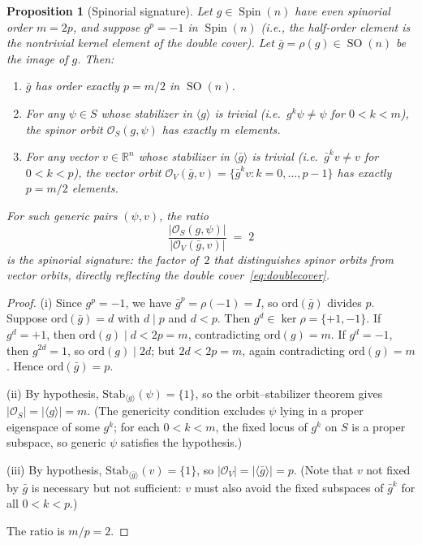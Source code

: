 \documentclass[11pt,reqno]{amsart}
\theoremstyle{plain}
\newtheorem{proposition}[theorem]{Proposition}
\theoremstyle{definition}
\theoremstyle{remark}
\newcommand{\R}{\mathbb{R}}
\newcommand{\Stab}{\mathrm{Stab}}
\DeclareMathOperator{\Spin}{Spin}
\DeclareMathOperator{\SO}{SO}
\begin{document}
\begin{proposition}[Spinorial signature]\label{prop:signature}
Let $g \in \Spin(n)$ have even spinorial order $m = 2p$,
and suppose $g^p = -1$ in $\Spin(n)$
(i.e., the half-order element is the nontrivial kernel element
of the double cover).
Let $\bar{g} = \rho(g) \in \SO(n)$ be the image of $g$.
Then:
\begin{enumerate}[label=(\roman*)]
\item $\bar{g}$ has order exactly $p = m/2$ in $\SO(n)$.
\item For any $\psi \in S$ whose stabilizer in
  $\langle g \rangle$ is trivial
  (i.e.\ $g^k \psi \neq \psi$ for $0 < k < m$),
  the spinor orbit
  $\mathcal{O}_S(g,\psi)$ has exactly $m$ elements.
\item For any vector $v \in \R^n$ whose stabilizer in
  $\langle \bar{g} \rangle$ is trivial
  (i.e.\ $\bar{g}^k v \neq v$ for $0 < k < p$),
  the vector orbit
  $\mathcal{O}_V(\bar{g},v) =
  \{\bar{g}^k v : k = 0,\ldots,p-1\}$
  has exactly $p = m/2$ elements.
\end{enumerate}
For such generic pairs $(\psi, v)$, the ratio
\begin{equation}\label{eq:signature}
  \frac{|\mathcal{O}_S(g,\psi)|}{|\mathcal{O}_V(\bar{g},v)|}
  \;=\; 2
\end{equation}
is the \emph{spinorial signature}: the factor of~$2$ that
distinguishes spinor orbits from vector orbits, directly
reflecting the double cover~\eqref{eq:doublecover}.
\end{proposition}

\begin{proof}
(i) Since $g^p = -1$, we have
$\bar{g}^p = \rho(-1) = I$, so
$\mathrm{ord}(\bar{g})$ divides $p$.
Suppose $\mathrm{ord}(\bar{g}) = d$ with $d \mid p$
and $d < p$.
Then $g^d \in \ker\rho = \{+1,-1\}$.
If $g^d = +1$, then $\mathrm{ord}(g) \mid d < 2p = m$,
contradicting $\mathrm{ord}(g) = m$.
If $g^d = -1$, then $g^{2d} = 1$, so
$\mathrm{ord}(g) \mid 2d$; but $2d < 2p = m$,
again contradicting $\mathrm{ord}(g) = m$.
Hence $\mathrm{ord}(\bar{g}) = p$.

(ii) By hypothesis,
$\Stab_{\langle g\rangle}(\psi) = \{1\}$,
so the orbit--stabilizer theorem gives
$|\mathcal{O}_S| = |\langle g\rangle| = m$.
(The genericity condition excludes $\psi$ lying in
a proper eigenspace of some $g^k$; for each
$0 < k < m$, the fixed locus of $g^k$ on $S$ is a
proper subspace, so generic $\psi$ satisfies the hypothesis.)

(iii) By hypothesis,
$\Stab_{\langle\bar{g}\rangle}(v) = \{1\}$,
so $|\mathcal{O}_V| = |\langle\bar{g}\rangle| = p$.
(Note that $v$ not fixed by $\bar{g}$ is necessary but
not sufficient: $v$ must also avoid the fixed subspaces of
$\bar{g}^k$ for all $0 < k < p$.)

The ratio is $m/p = 2$.
\end{proof}
\end{document}

